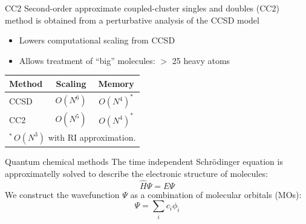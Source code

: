 \documentclass[9pt,t,xcolor=table]{beamer}
\begin{document}
\begin{frame}{\huge CC2}\large
	Second-order approximate coupled-cluster singles and doubles (CC2) method is obtained from a perturbative analysis of the CCSD model
	\vspace{5pt}
	\begin{itemize}
		\item Lowers computational scaling from CCSD 
		\item Allows treatment of “big” molecules: $>$ 25 heavy atoms
	\end{itemize}
	\centering
	\vspace{30pt}
	\begin{table}
		\centering
		\begin{tabular}{lcc}\toprule
		\textbf{Method} & \textbf{Scaling} & \textbf{Memory}\\\midrule
		CCSD & $O(N^6)$ & $O(N^{4})^*$\\
		CC2 & $O(N^5)$ & $O(N^{4})^*$\\\bottomrule
		\multicolumn{3}{l}{\small $^*\,O(N^3)$ with RI approximation.}
		\end{tabular}
	\end{table}
\end{frame}

\begin{frame}{\huge Quantum chemical methods}\large
	The time independent Schrödinger equation is approximatelly solved to describe the electronic structure of molecules:
	\begin{equation*}
		\hat{H} \Psi = E \Psi
	\end{equation*}
	We construct the wavefunction $\Psi$ as a combination of molecular orbitals (MOs):
	\begin{equation*}
		\Psi = \sum_{i} c_i \phi_i
	\end{equation*}
\end{frame}
\fi
\end{document}
